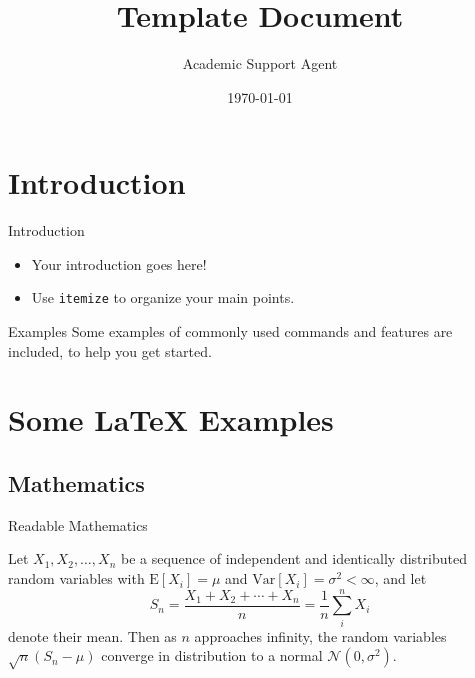 \documentclass{article}
\title{Template Document}
\author{Academic Support Agent}
\date{\today}
\begin{document}
\maketitle

\begin{frame}
  \titlepage
\end{frame}

%  

\section{Introduction}

\begin{frame}{Introduction}

\begin{itemize}
  \item Your introduction goes here!
  \item Use \texttt{itemize} to organize your main points.
\end{itemize}

\begin{block}{Examples}
Some examples of commonly used commands and features are included, to help you get started.
\end{block}

\end{frame}

\section{Some \LaTeX{} Examples}

\subsection{Mathematics}

\begin{frame}{Readable Mathematics}

Let $X_1, X_2, \ldots, X_n$ be a sequence of independent and identically distributed random variables with $\text{E}[X_i] = \mu$ and $\text{Var}[X_i] = \sigma^2 < \infty$, and let
$$S_n = \frac{X_1 + X_2 + \cdots + X_n}{n}
      = \frac{1}{n}\sum_{i}^{n} X_i$$
denote their mean. Then as $n$ approaches infinity, the random variables $\sqrt{n}(S_n - \mu)$ converge in distribution to a normal $\mathcal{N}(0, \sigma^2)$.

\end{frame}
\end{document}
